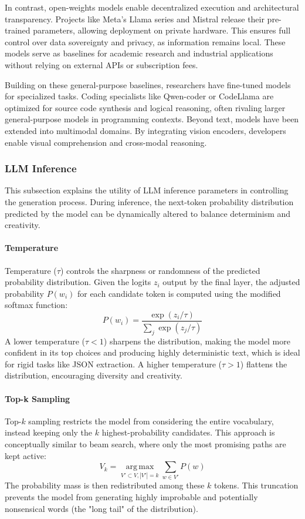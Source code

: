 In contrast, open-weights models enable decentralized execution and architectural transparency. Projects like Meta's Llama series and Mistral release their pre-trained parameters, allowing deployment on private hardware. This ensures full control over data sovereignty and privacy, as information remains local. These models serve as baselines for academic research and industrial applications without relying on external APIs or subscription fees.

Building on these general-purpose baselines, researchers have fine-tuned models for specialized tasks. Coding specialists like Qwen-coder or CodeLlama are optimized for source code synthesis and logical reasoning, often rivaling larger general-purpose models in programming contexts. Beyond text, models have been extended into multimodal domains. By integrating vision encoders, developers enable visual comprehension and cross-modal reasoning.

\subsubsection*{LLM Inference}

This subsection explains the utility of LLM inference parameters in controlling the generation process. During inference, the next-token probability distribution predicted by the model can be dynamically altered to balance determinism and creativity.

\paragraph*{Temperature}
Temperature ($\tau$) controls the sharpness or randomness of the predicted probability distribution. Given the logits $z_i$ output by the final layer, the adjusted probability $P(w_i)$ for each candidate token is computed using the modified softmax function:
\begin{equation}
P(w_i) = \frac{\exp(z_i / \tau)}{\sum_{j} \exp(z_j / \tau)}
\end{equation}
A lower temperature ($\tau < 1$) sharpens the distribution, making the model more confident in its top choices and producing highly deterministic text, which is ideal for rigid tasks like JSON extraction. A higher temperature ($\tau > 1$) flattens the distribution, encouraging diversity and creativity.

\paragraph*{Top-k Sampling}
Top-$k$ sampling restricts the model from considering the entire vocabulary, instead keeping only the $k$ highest-probability candidates. This approach is conceptually similar to beam search, where only the most promising paths are kept active:
\begin{equation}
V_k = \mathop{\mathrm{arg\,max}}\limits_{V' \subset V, |V'|=k} \sum_{w \in V'} P(w)
\end{equation}
The probability mass is then redistributed among these $k$ tokens. This truncation prevents the model from generating highly improbable and potentially nonsensical words (the "long tail" of the distribution).

